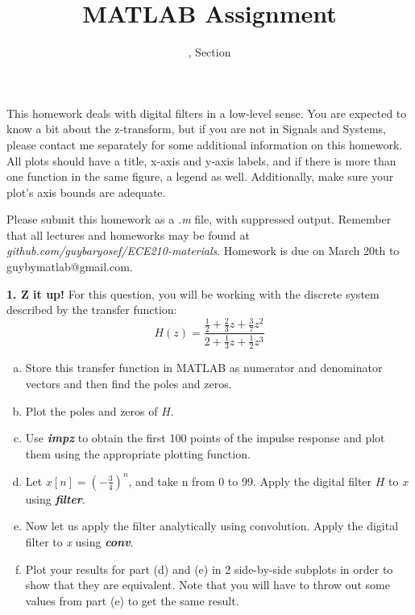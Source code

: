 \documentclass[11pt]{article}
\title{MATLAB Assignment \Homework}
\author{\Session, Section \Section}
\date{}
\makeatletter
\def\MyEmail{guybymatlab@gmail.com}
\def\DateOfSubmission{March 20th }
\makeatother
\begin{document}
\maketitle
This homework deals with digital filters in a low-level sense.
You are expected to know a bit about the z-transform,
but if you are not in Signals and Systems,
please contact me separately for some additional information on this homework.
All plots should have a title, x-axis and y-axis labels,
and if there is more than one function in the same figure, a legend as well.
Additionally, make sure your plot's axis bounds are adequate. 

Please submit this homework as a \textit{.m} file, 
with suppressed output.
Remember that all lectures and homeworks may be found at 
\textit{github.com/guybaryosef/ECE210-materials}.
Homework is due on \DateOfSubmission to \MyEmail.

\noindent
\newline
\textbf{1. Z it up!}
For this question,
you will be working with the discrete system described by the transfer function: 
$$H(z) = \frac{\frac{1}{2}+\frac{2}{3}z+\frac{3}{7}z^2}{2+\frac{1}{3}z+\frac{1}{2}z^3}$$
\begin{enumerate}[a.]
    \item Store this transfer function in MATLAB as numerator and denominator vectors and
    then find the poles and zeros.
    
    \item Plot the poles and zeros of $H$.

    \item Use \textit{\textbf{impz}} to obtain the first 100 points of the impulse response
    and plot them using the appropriate plotting function. 
    
    \item Let $x[n] = (-\frac{3}{4})^n$, and take n from 0 to 99.
    Apply the digital filter $H$ to $x$ using \textit{\textbf{filter}}. 
    
    \item Now let us apply the filter analytically using convolution.
    Apply the digital filter to \textit{x} using \textit{\textbf{conv}}.
    
    \item Plot your results for part (d) and (e) in 2 side-by-side subplots in order to
    show that they are equivalent. Note that you will have to throw out some values from
    part (e) to get the same result.


\end{enumerate}
\end{document}
